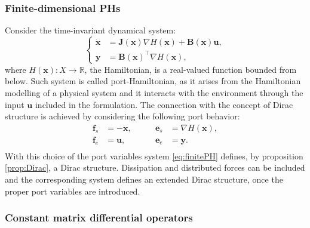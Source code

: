 \subsubsection{Finite-dimensional PHs}
Consider the time-invariant dynamical system:
\begin{equation}
\label{eq:finitePH}
\begin{cases}
\dot{ \mathbf{x} } &= \mathbf{J}(\mathbf{x}) \nabla H(\mathbf{x}) + \mathbf{B}(\mathbf{x})\mathbf{u}, \\
\mathbf{y} &= \mathbf{B}(\mathbf{x})^\top \nabla H(\mathbf{x}),
\end{cases}
\end{equation}
where $ H(\mathbf{x}) : X \rightarrow \mathbb{R} $, the Hamiltonian, is a real-valued function bounded from below. Such system is called port-Hamiltonian, as it arises from the Hamiltonian modelling of a physical system and it interacts with the environment through the input $\mathbf{u}$ included in the formulation. The connection with the concept of Dirac structure is achieved by considering the following port behavior:
\begin{equation}
\begin{aligned}
\mathbf{f}_s &= - \dot{\mathbf{x}}, \qquad 
&\mathbf{e}_s &= \nabla{H}(\mathbf{x}), \\
\mathbf{f}_e &= \mathbf{u}, \qquad
&\mathbf{e}_e &= \mathbf{y}. \\
\end{aligned}
\end{equation}
With this choice of the port variables system \eqref{eq:finitePH} defines, by proposition \ref{prop:Dirac}, a Dirac structure. Dissipation and distributed forces can be included and the corresponding system defines an extended Dirac structure, once the proper port variables are introduced.

\subsubsection{Constant matrix differential operators}

